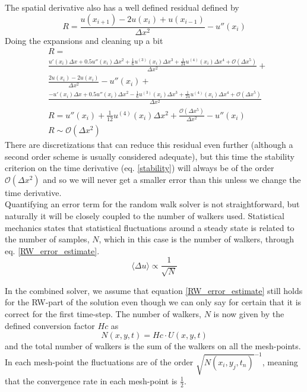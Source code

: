 The spatial derivative also has a well defined residual defined by
\begin{equation}
R = \frac{u(x_{i+1})-2u(x_i)+u(x_{i-1})}{\Delta x^2}-u''(x_i) 
\end{equation}
Doing the expansions and cleaning up a bit 
\begin{align*}
 &R =\\& \frac{u'(x_i)\Delta x +0.5u''(x_i)\Delta x^2 + \frac{1}{6}u^{(3)}(x_i)\Delta x^3 +\frac{1}{24}u^{(4)}(x_i)\Delta x^4 +\mathcal{O}(\Delta x^5)}{\Delta x^2}+\\ &\frac{2u(x_i)-2u(x_i)}{\Delta x^2} -u''(x_i) +\\
 &\frac{-u'(x_i)\Delta x +0.5u''(x_i)\Delta x^2 - \frac{1}{6}u^{(3)}(x_i)\Delta x^3 +\frac{1}{24}u^{(4)}(x_i)\Delta x^4 +\mathcal{O}(\Delta x^5)}{\Delta x^2} \\
&R = u''(x_i) +\frac{1}{12}u^{(4)}(x_i)\Delta x^2 + \frac{\mathcal{O}(\Delta x^5)}{\Delta x^2}  -u''(x_i) \\
&R\sim \mathcal{O}(\Delta x^2) 
\end{align*}
There are discretizations that can reduce this residual even further (although a second order scheme is usually considered adequate), but this time the stability criterion on the time derivative (eq. \eqref{stability}) will always be of the order $\mathcal{O}(\Delta x^2)$ and so we will never get a smaller error than this unless we change the time derivative. \\


Quantifying an error term for the random walk solver is not straightforward, but naturally it will be closely coupled to the number of walkers used. 
Statistical mechanics states that statistical fluctuations around a steady state is related to the number of samples, $N$, which in this case is the number of walkers, through eq. \eqref{RW_error_estimate}.
\begin{equation}\label{RW_error_estimate}
 \langle\Delta u\rangle \propto \frac{1}{\sqrt{N}}
\end{equation}

In the combined solver, we assume that equation \ref{RW_error_estimate} still holds for the RW-part of the solution even though we can only say for certain that it is correct for the first time-step. 
The number of walkers, $N$ is now given by the defined conversion factor $Hc$ as 
\begin{equation}
 N(x,y,t) = Hc\cdot U(x,y,t)
\end{equation}
and the total number of walkers is the sum of the walkers on all the mesh-points. 
In each mesh-point the fluctuations are of the order $\sqrt{N(x_i,y_j,t_n)}^{-1}$, meaning that the convergence rate in each mesh-point is $\frac{1}{2}$.

